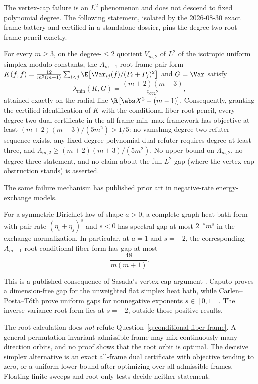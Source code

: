 \documentclass[../../main.tex]{subfiles}
\begin{document}
The vertex-cap failure is an $L^2$ phenomenon and does not descend to fixed polynomial degree.
The following statement, isolated by the 2026-08-30 exact frame battery and certified in a
standalone dossier, pins the degree-two root-frame pencil exactly.

\begin{lemma}
\label{lem:fiber-root-degree-two}
For every $m\ge3$, on the degree-$\le2$ quotient $V_{m,2}$ of $L^2$ of the isotropic uniform
simplex modulo constants, the $A_{m-1}$ root-frame pair form
$K(f,f)=\tfrac{12}{m^2(m+1)}\sum_{i<j}\E\bigl[\Var_{ij}(f)/(P_i+P_j)^2\bigr]$ and $G=\Var$
satisfy
\[
  \lambda_{\min}(K,G)=\frac{(m+2)(m+3)}{5m^2},
\]
attained exactly on the radial line $\R\,[\abs X^2-(m-1)]$. Consequently, granting the
certified identification of $K$ with the conditional-fiber root pencil, every degree-two dual
certificate in the all-frame min--max framework has objective at least $(m+2)(m+3)/(5m^2)>1/5$:
no vanishing degree-two refuter sequence exists, any fixed-degree polynomial dual refuter
requires degree at least three, and $\Lambda_{m,2}\ge(m+2)(m+3)/(5m^2)$. No upper bound on
$\Lambda_{m,2}$, no degree-three statement, and no claim about the full $L^2$ gap (where the
vertex-cap obstruction stands) is asserted.
\end{lemma}

The same failure mechanism has published prior art in negative-rate energy-exchange models.

\begin{proposition}
\label{prop:sasada-negative-exchange}
For a symmetric-Dirichlet law of shape $a>0$, a complete-graph heat-bath form with pair rate
$(\eta_i+\eta_j)^s$ and $s<0$ has spectral gap at most $2^{-s}m^s$ in the exchange
normalization. In particular, at $a=1$ and $s=-2$, the corresponding $A_{m-1}$ root
conditional-fiber form has gap at most
\[
  \frac{48}{m(m+1)}.
\]
\end{proposition}

This is a published consequence of Sasada's vertex-cap argument
\cite{Sasada2015EnergyExchange}. Caputo proves a dimension-free gap for the unweighted flat
simplex heat bath, while Carlen--Posta--T\'oth prove uniform gaps for nonnegative exponents
$s\in[0,1]$ \cite{Caputo2008BinaryCollision,CarlenPostaToth2025Exchange}. The inverse-variance
root form lies at $s=-2$, outside those positive results.

The root calculation does \emph{not} refute Question~\ref{q:conditional-fiber-frame}. A general
permutation-invariant admissible frame may mix continuously many direction orbits, and no proof
shows that the root orbit is optimal. The decisive simplex alternative is an exact all-frame
dual certificate with objective tending to zero, or a uniform lower bound after optimizing over
all admissible frames. Floating finite sweeps and root-only tests decide neither statement.
\end{document}

